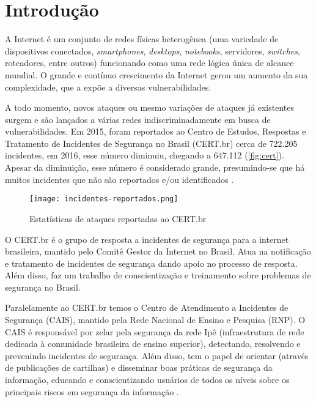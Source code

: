 \chapter{Introdução} \label{ch:introdução}

A Internet é um conjunto de redes físicas heterogênea (uma variedade de dispositivos conectados, \textit{smartphones}, \textit{desktops}, \textit{notebooks}, servidores, \textit{switches}, roteadores, entre outros) funcionando como uma rede lógica única de alcance mundial. O grande e contínuo crescimento da Internet gerou um aumento da sua complexidade, que a expõe a diversas vulnerabilidades. 

A todo momento, novos ataques ou mesmo variações de ataques já existentes surgem e são lançados a várias redes indiscriminadamente em busca de vulnerabilidades. Em 2015, foram reportados ao Centro de Estudos, Respostas e Tratamento de Incidentes de Segurança no Brasil (CERT.br) cerca de 722.205 incidentes, em 2016, esse número diminuiu, chegando a 647.112 (\autoref{fig:cert}). Apesar da diminuição, esse número é considerado grande, presumindo-se que há muitos incidentes que não são reportados e/ou identificados \cite{estatistica:cert.br}.

\begin{figure}[!htb]
 \centering
 \caption{Estatísticas de ataques reportadas ao CERT.br}
 \texttt{[image: incidentes-reportados.png]}
 \label{fig:cert}
\end{figure}

O CERT.br é o grupo de resposta a incidentes de segurança para a internet brasileira, mantido pelo Comitê Gestor da Internet no Brasil. Atua na notificação e tratamento de incidentes de segurança dando apoio no processo de resposta. Além disso, faz um trabalho de conscientização e treinamento sobre problemas de segurança no Brasil.

Paralelamente ao CERT.br temos o Centro de Atendimento a Incidentes de Segurança (CAIS), mantido pela Rede Nacional de Ensino e Pesquisa (RNP). O CAIS é responsável por zelar pela segurança da rede Ipê (infraestrutura de rede dedicada à comunidade brasileira de ensino superior), detectando, resolvendo e prevenindo incidentes de segurança. Além disso, tem o papel de orientar (através de publicações de cartilhas) e disseminar boas práticas de segurança da informação, educando e conscientizando usuários de todos os níveis sobre os principais riscos em segurança da informação \cite{cais}.

